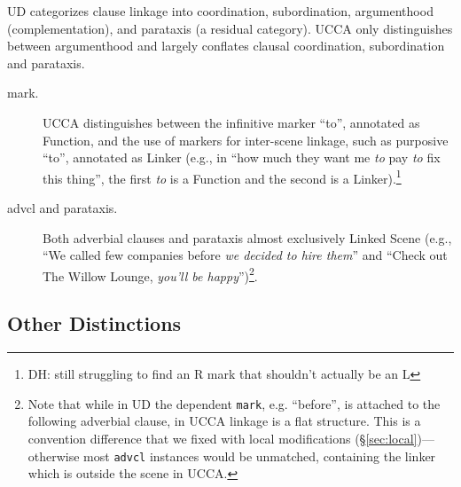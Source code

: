 \documentclass[11pt,a4paper]{article}
\newcommand{\daniel}[1]{\footnote{\color{blue}DH: #1}}
\begin{document}
UD categorizes clause linkage into coordination,
subordination, argumenthood (complementation),
and parataxis (a residual category).
UCCA only distinguishes between argumenthood 
and largely conflates clausal coordination, subordination and parataxis.
\begin{description}
    \item[mark.]
    UCCA distinguishes between the infinitive marker ``to'', annotated as Function,
    and the use of markers for inter-scene linkage, such as purposive ``to'',
    annotated as Linker
    (e.g., in ``how much they want me \textit{to} pay \textit{to} fix this thing'',
    the first \textit{to} is a Function and the second is a Linker).\daniel{still
    struggling to find an R mark that shouldn't actually be an L}
    \item[advcl and parataxis.]
    Both adverbial clauses and parataxis almost exclusively Linked Scene
    (e.g., ``We called few companies before \textit{we decided to hire them}''
    and ``Check out The Willow Lounge, \textit{you'll be happy}'')\footnote{Note
    that while in UD the dependent \texttt{mark}, e.g. ``before'',
    is attached to the following adverbial clause,
    in UCCA linkage is a flat structure.
    This is a convention difference that we fixed with local modifications
    (\S\ref{sec:local})---otherwise most \texttt{advcl} instances would be unmatched,
    containing the linker which is outside the scene in UCCA.}.
\end{description}
    

\subsection{Other Distinctions}\label{sec:misc}
\end{document}
